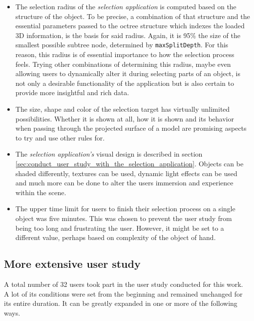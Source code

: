 \begin{itemize}
	\item The selection radius of the \textit{selection application} is computed based on the structure of the object. To be precise, a combination of that structure and the essential parameters passed to the octree structure which indexes the loaded 3D information, is the basis for said radius. Again, it is 95\% the size of the smallest possible subtree node, determined by \texttt{maxSplitDepth}. For this reason, this radius is of essential importance to how the selection process feels. Trying other combinations of determining this radius, maybe even allowing users to dynamically alter it during selecting parts of an object, is not only a desirable functionality of the application but is also certain to provide more insightful and rich data.
	\item The size, shape and color of the selection target has virtually unlimited possibilities. Whether it is shown at all, how it is shown and its behavior when passing through the projected surface of a model are promising aspects to try and use other rules for.
	\item The \textit{selection application's} visual design is described in section \ref{sec:conduct_user_study_with_the_selection_application}. Objects can be shaded differently, textures can be used, dynamic light effects can be used and much more can be done to alter the users immersion and experience within the scene.
	\item The upper time limit for users to finish their selection process on a single object was five minutes. This was chosen to prevent the user study from being too long and frustrating the user. However, it might be set to a different value, perhaps based on complexity of the object of hand.
\end{itemize}

	\subsection{More extensive user study}
	\label{sec:more_extensive_user_study}
A total number of 32 users took part in the user study conducted for this work. A lot of its conditions were set from the beginning and remained unchanged for its entire duration. It can be greatly expanded in one or more of the following ways.

